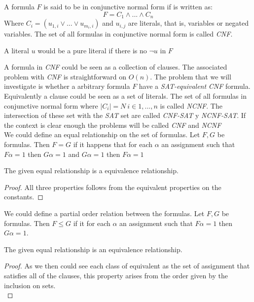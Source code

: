 	
	
\begin{definition}
	A formula $F$ is said to be in conjunctive normal form if is written as:
	$$F = C_1\wedge ... \wedge C_n$$
	Where $C_i = (u_{1,i} \vee ... \vee u_{m_i,i})$  and $u_{i,j}$ are literals, that is, variables or negated variables. The set of all formulas in conjunctive normal form is called \emph{CNF}.

        A literal $u$ would be a pure literal if there is no $\neg u$ in $F$
\end{definition}
	
A formula in \emph{CNF} could be seen as a collection of clauses. The associated problem with \emph{CNF} is straightforward on $O(n)$. The problem that we will investigate is whether a arbitrary formula $F$ have a \emph{SAT-equivalent} \emph{CNF} formula.
Equivalently a clause could be seen as a set of literals. The set of all formulas in conjunctive normal form where $|C_i| = N\ i \in 1,...,n$ is called \emph{NCNF}. The intersection of these set with the \emph{SAT} set are called \emph{CNF-SAT} y \emph{NCNF-SAT}. If the context is clear enough the problems will be called \emph{CNF} and \emph{NCNF}\\


	We could define an equal relationship on the set of formulas. Let $F,G$ be formulas. Then $F= G$ if it happens that for each $\alpha$ an assignment such that $F\alpha = 1$ then $G\alpha = 1$ and $G\alpha = 1$ then $F\alpha = 1$

\begin{proposition} 
	The given equal relationship is a equivalence relationship.
\end{proposition}
\begin{proof}
	All three properties follows from the equivalent properties on the constants.

        \end{proof}
	
	
	We could define a partial order relation between the formulas.	Let $F,G$ be formulas. Then $F\le G$ if it for each $\alpha$ an assignment such that $F\alpha = 1$ then $G\alpha = 1$. \\
	
	
\begin{proposition} 
	The given equal relationship is an equivalence relationship.
\end{proposition}
\begin{proof}
As we then could see each class of equivalent as the set of assignment that satisfies all of the clauses, this property arises from the order given by the inclusion on sets.\\
\end{proof}
	
